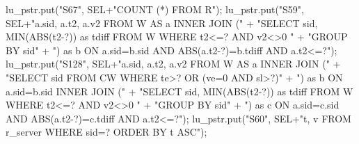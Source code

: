 \documentclass{article}
\def\nwendcode{\endtrivlist \endgroup}      %
\theoremstyle{definition}                   %
\begin{document}
lu_pstr.put("S67", SEL+"COUNT (*) FROM R");
\eatline
{}\nwendcode{}\endmoddef{}
lu_pstr.put("S59", SEL+"a.sid, a.t2, a.v2 FROM W AS a INNER JOIN ("
      + "SELECT sid, MIN(ABS(t2-?)) as tdiff FROM W WHERE t2<=? AND v2<>0 "
      + "GROUP BY sid"
      + ") as b ON a.sid=b.sid AND ABS(a.t2-?)=b.tdiff AND a.t2<=?");
\eatline
{}\nwendcode{}\endmoddef{}
lu_pstr.put("S128", SEL+"a.sid, a.t2, a.v2 FROM W AS a INNER JOIN ("
      + "SELECT sid FROM CW WHERE te>? OR (ve=0 AND sl>?)"
      + ") as b ON a.sid=b.sid INNER JOIN ("
      + "SELECT sid, MIN(ABS(t2-?)) as tdiff FROM W WHERE t2<=? AND v2<>0 "
      + "GROUP BY sid"
      + ") as c ON a.sid=c.sid AND ABS(a.t2-?)=c.tdiff AND a.t2<=?");
\eatline
{}\nwendcode{}\endmoddef{}
lu_pstr.put("S60", SEL+"t, v FROM r_server WHERE sid=? ORDER BY t ASC");
\eatline
{}\nwendcode{}\endmoddef{}
\end{document}
